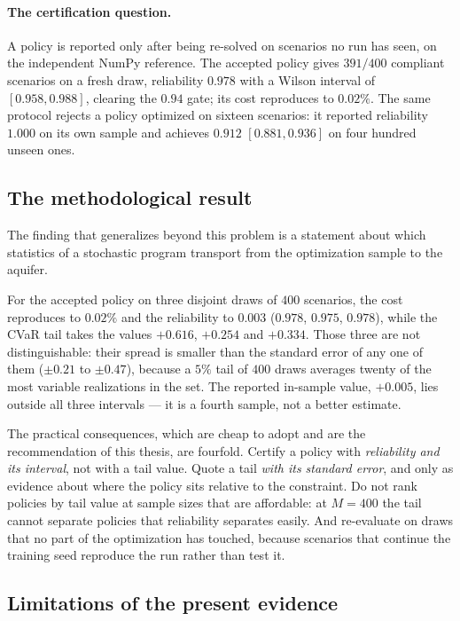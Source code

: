 \paragraph{The certification question.} A policy is reported only after being
re-solved on scenarios no run has seen, on the independent NumPy reference. The
accepted policy gives $391/400$ compliant scenarios on a fresh draw,
reliability $0.978$ with a Wilson interval of $[0.958, 0.988]$, clearing the
$0.94$ gate; its cost reproduces to $0.02\%$. The same protocol rejects a policy
optimized on sixteen scenarios: it reported reliability $1.000$ on its own
sample and achieves $0.912$ $[0.881, 0.936]$ on four hundred unseen ones.

\subsection{The methodological result}

The finding that generalizes beyond this problem is a statement about which
statistics of a stochastic program transport from the optimization sample to the
aquifer.

For the accepted policy on three disjoint draws of $400$ scenarios, the cost
reproduces to $0.02\%$ and the reliability to $0.003$
($0.978$, $0.975$, $0.978$), while the CVaR tail takes the values $+0.616$,
$+0.254$ and $+0.334$. Those three are not distinguishable: their spread is
smaller than the standard error of any one of them ($\pm0.21$ to $\pm0.47$),
because a $5\%$ tail of $400$ draws averages twenty of the most variable
realizations in the set. The reported in-sample value, $+0.005$, lies outside all
three intervals --- it is a fourth sample, not a better estimate.

The practical consequences, which are cheap to adopt and are the recommendation
of this thesis, are fourfold. Certify a policy with \emph{reliability and its
interval}, not with a tail value. Quote a tail \emph{with its standard error}, and
only as evidence about where the policy sits relative to the constraint. Do not
rank policies by tail value at sample sizes that are affordable: at $M=400$ the
tail cannot separate policies that reliability separates easily. And re-evaluate
on draws that no part of the optimization has touched, because scenarios that
continue the training seed reproduce the run rather than test it.

\subsection{Limitations of the present evidence}

